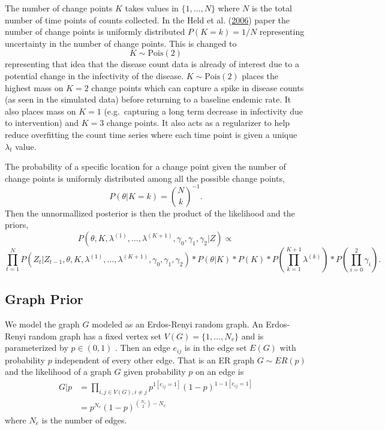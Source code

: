 \documentclass[11pt,a4paper]{article}
\numberwithin{equation}{section}
\begin{document}
The number of change points \(K\) takes values in \(\{1,\dots,N\}\)
where \(N\) is the total number of time points of counts collected. In
the Held et al. (\protect\hyperlink{ref-held_two-component_2006}{2006})
paper the number of change points is uniformly distributed
\(P(K = k) = 1/N\) representing uncertainty in the number of change
points. This is changed to \[K \sim \text{Pois}(2)\] representing that
idea that the disease count data is already of interest due to a
potential change in the infectivity of the disease.
\(K \sim\text{Pois}(2)\) places the highest mass on \(K = 2\) change
points which can capture a spike in disease counts (as seen in the
simulated data) before returning to a baseline endemic rate. It also
places mass on \(K = 1\) (e.g.~capturing a long term decrease in
infectivity due to intervention) and \(K = 3\) change points. It also
acts as a regularizer to help reduce overfitting the count time series
where each time point is given a unique \(\lambda_t\) value.

The probability of a specific location for a change point given the
number of change points is uniformly distributed among all the possible
change points, \[P(\theta|K=k) = \binom{N}{k}^{-1}.\] Then the
unnormallized posterior is then the product of the likelihood and the
priors, 
\[ P(\theta, K, \lambda^{(1)}, \dots, \lambda^{(K+1)}, \gamma_0, \gamma_1, \gamma_2|Z)  \propto \]
\[\prod_{t=1}^N P(Z_t|Z_{t-1},\theta, K, \lambda^{(1)}, \dots, \lambda^{(K+1)}, \gamma_0, \gamma_1, \gamma_2)*P(\theta|K)*P(K)*P(\prod_{k=1}^{K+1}\lambda^{(k)} )*P(\prod_{i=0}^2 \gamma_i)  .\]

\hypertarget{graph-prior}{%
\subsection{Graph Prior}\label{graph-prior}}

We model the graph \(G\) modeled as an Erdos-Renyi random graph. An
Erdos-Renyi random graph has a fixed vertex set
\(V(G) = \{1, \dots, N_v\}\) and is parameterized by \(p \in (0,1)\) .
Then an edge \(e_{ij}\) is in the edge set \(E(G)\) with probability
\(p\) independent of every other edge. That is an ER graph
\(G \sim ER(p)\) and the likelihood of a graph \(G\) given probability
\(p\) on an edge is
\[\begin{aligned} G|p & = \prod_{i,j \in V(G),i \neq j} p^{1[e_{ij}=1]}(1-p)^{1-1[e_{ij}=1]} 
\\ & = p^{N_e}(1-p)^{\binom{N_v}{2}-N_e} \end{aligned}\] where \(N_e\)
is the number of edges.
\end{document}
